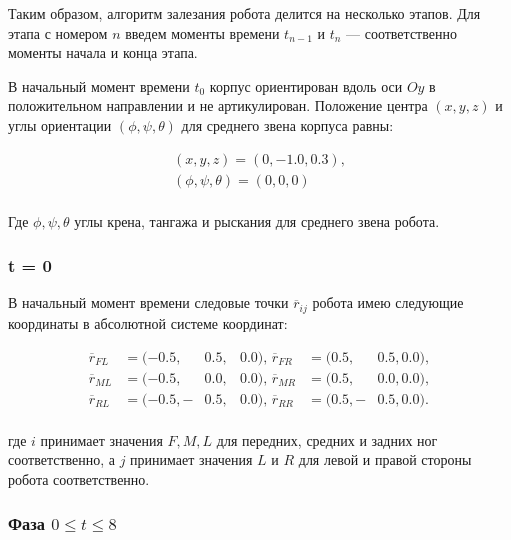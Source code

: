 Таким образом, алгоритм залезания робота делится на несколько этапов. Для этапа с номером $n$ введем моменты времени $t_{n-1}$ и $t_n$ --- соответственно моменты начала и конца этапа.

В начальный момент времени $t_0$ корпус ориентирован вдоль оси $Oy$ в положительном направлении и не артикулирован. Положение центра $(x,y,z)$ и углы ориентации $(\phi,\psi,\theta)$ для среднего звена корпуса равны:

\begin{equation}
  \begin{alignedat}{2}
    (x,y,z) = (0, -1.0, 0.3),\\
    (\phi,\psi,\theta) = (0, 0, 0)\\
  \end{alignedat}
\end{equation}

Где $\phi, \psi, \theta$ углы крена, тангажа и рыскания для среднего звена робота.


\subsubsection {t = 0}

В начальный момент времени следовые точки $\overline{r}_{ij}$ робота имею следующие координаты в абсолютной системе координат:

\begin{equation}
\label{articulated:initial_step}
  \begin{alignedat}{10}
    \overline{r}_{FL} &= (-0.5, &0.5, &0.0),\,\overline{r}_{FR} &= (0.5, &0.5, 0.0),\\
    \overline{r}_{ML} &= (-0.5, &0.0, &0.0),\,\overline{r}_{MR} &= (0.5, &0.0, 0.0),\\
    \overline{r}_{RL} &= (-0.5,-&0.5, &0.0),\,\overline{r}_{RR} &= (0.5,-&0.5,0.0).\\
  \end{alignedat}
\end{equation}

где $i$ принимает значения $F,M,L$ для передних, средних и задних ног соответственно, а $j$ принимает значения $L$ и $R$ для левой и правой стороны робота соответственно.




\subsubsection{Фаза  $0 \leq t \leq 8$}

